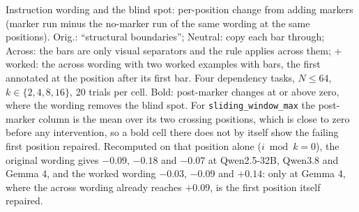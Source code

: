 \documentclass[10pt]{article} %
\newcommand{\task}[1]{\texttt{#1}}
\begin{document}
\begin{table}[t]
\centering
\small
\caption{Instruction wording and the blind spot: per-position change from adding markers (marker run minus the no-marker run of the same wording at the same positions). Orig.: ``structural boundaries''; Neutral: copy each bar through; Across: the bars are only visual separators and the rule applies across them; + worked: the across wording with two worked examples with bars, the first annotated at the position after its first bar. Four dependency tasks, $N \le 64$, $k \in \{2,4,8,16\}$, 20 trials per cell. Bold: post-marker changes at or above zero, where the wording removes the blind spot. For \task{sliding\_window\_max} the post-marker column is the mean over its two crossing positions, which is close to zero before any intervention, so a bold cell there does not by itself show the failing first position repaired. Recomputed on that position alone ($i \bmod k = 0$), the original wording gives $-0.09$, $-0.18$ and $-0.07$ at Qwen2.5-32B, Qwen3.8 and Gemma 4, and the worked wording $-0.03$, $-0.09$ and $+0.14$: only at Gemma 4, where the across wording already reaches $+0.09$, is the first position itself repaired.}
\label{tab:wording}
\resizebox{\linewidth}{!}{}
\end{table}
\end{document}

